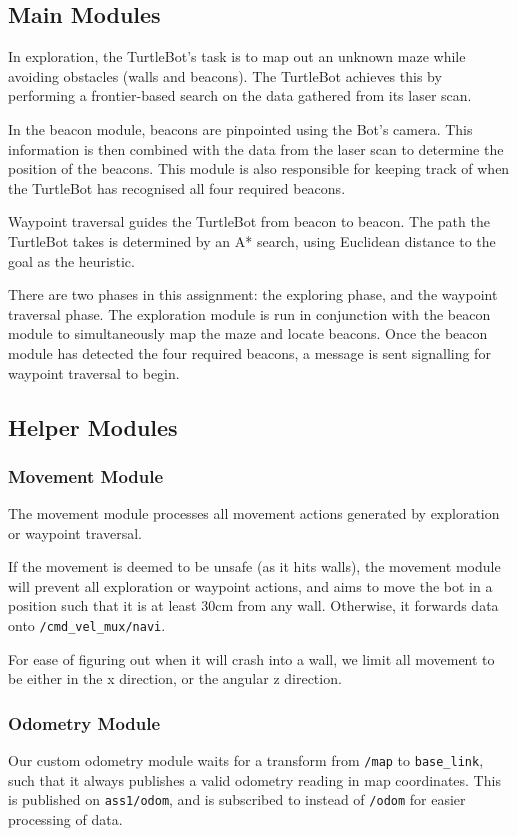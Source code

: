 \documentclass[titlepage,12pt,a4paper]{article}
\begin{document}
\subsection{Main Modules}
In exploration, the TurtleBot's task is to map out an unknown maze while avoiding obstacles (walls and beacons). The TurtleBot achieves this by performing a frontier-based search on the data gathered from its laser scan. 

In the beacon module, beacons are pinpointed using the Bot's camera. This information is then combined with the data from the laser scan to determine the position of the beacons. This module is also responsible for keeping track of when the TurtleBot has recognised all four required beacons. 

Waypoint traversal guides the TurtleBot from beacon to beacon. The path the TurtleBot takes is determined by an A* search, using Euclidean distance to the goal as the heuristic. 

There are two phases in this assignment: the exploring phase, and the waypoint traversal phase. The exploration module is run in conjunction with the beacon module to simultaneously map the maze and locate beacons. Once the beacon module has detected the four required beacons, a message is sent signalling for waypoint traversal to begin. 

\subsection{Helper Modules}
\subsubsection{Movement Module}
The movement module processes all movement actions generated by exploration or waypoint traversal. 

If the movement is deemed to be unsafe (as it hits walls), the movement module will prevent all exploration or waypoint actions, and aims to move the bot in a position such that it is at least 30cm from any wall. Otherwise, it forwards data onto \verb|/cmd_vel_mux/navi|. 

For ease of figuring out when it will crash into a wall, we limit all movement to be either in the x direction, or the angular z direction.

\subsubsection{Odometry Module}
Our custom odometry module waits for a transform from \verb|/map| to \verb|base_link|, such that it always publishes a valid odometry reading in map coordinates. This is published on \verb|ass1/odom|, and is subscribed to instead of \verb|/odom| for easier processing of data.
\end{document}
